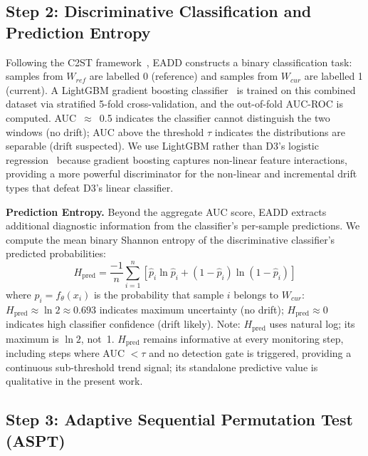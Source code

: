 \documentclass[conference,a4paper]{IEEEtran}
\begin{document}
\subsection{Step 2: Discriminative Classification and Prediction Entropy}

Following the C2ST framework~\cite{b19}, EADD constructs a binary classification task: samples from $W_{ref}$ are labelled 0 (reference) and samples from $W_{cur}$ are labelled 1 (current). A LightGBM gradient boosting classifier~\cite{b23} is trained on this combined dataset via stratified 5-fold cross-validation, and the out-of-fold AUC-ROC is computed. AUC~$\approx$~0.5 indicates the classifier cannot distinguish the two windows (no drift); AUC above the threshold $\tau$ indicates the distributions are separable (drift suspected). We use LightGBM rather than D3's logistic regression~\cite{b9} because gradient boosting captures non-linear feature interactions, providing a more powerful discriminator for the non-linear and incremental drift types that defeat D3's linear classifier.

\textbf{Prediction Entropy.} Beyond the aggregate AUC score, EADD extracts additional diagnostic information from the classifier's per-sample predictions. We compute the mean binary Shannon entropy of the discriminative classifier's predicted probabilities:
\begin{equation}
H_{\text{pred}} = \frac{-1}{n}\sum_{i=1}^{n}\left[\hat{p}_i\ln\hat{p}_i + (1{-}\hat{p}_i)\ln(1{-}\hat{p}_i)\right]
\label{eq:hpred}
\end{equation}
where $\hat{p}_i = f_\theta(x_i)$ is the probability that sample $i$ belongs to $W_{cur}$: $H_{\text{pred}} \approx \ln 2 \approx 0.693$ indicates maximum uncertainty (no drift); $H_{\text{pred}} \approx 0$ indicates high classifier confidence (drift likely). Note: $H_{\text{pred}}$ uses natural log; its maximum is $\ln 2$, not~1. $H_{\text{pred}}$ remains informative at every monitoring step, including steps where AUC $< \tau$ and no detection gate is triggered, providing a continuous sub-threshold trend signal; its standalone predictive value is qualitative in the present work.

\subsection{Step 3: Adaptive Sequential Permutation Test (ASPT)}
\end{document}
